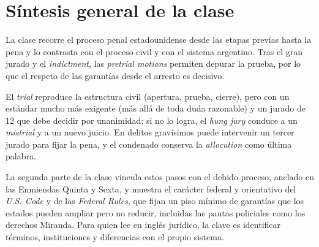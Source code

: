 \documentclass[12pt,oneside]{book}
\begin{document}
\chapter[Síntesis general de la clase]{Síntesis general de la clase}

La clase recorre el proceso penal estadounidense desde las etapas previas hasta la pena y lo contrasta con el proceso civil y con el sistema argentino. Tras el gran jurado y el \textit{indictment}, las \textit{pretrial motions} permiten depurar la prueba, por lo que el respeto de las garantías desde el arresto es decisivo.

El \textit{trial} reproduce la estructura civil (apertura, prueba, cierre), pero con un estándar mucho más exigente (más allá de toda duda razonable) y un jurado de 12 que debe decidir por unanimidad; si no lo logra, el \textit{hung jury} conduce a un \textit{mistrial} y a un nuevo juicio. En delitos gravísimos puede intervenir un tercer jurado para fijar la pena, y el condenado conserva la \textit{allocution} como última palabra.

La segunda parte de la clase vincula estos pasos con el debido proceso, anclado en las Enmiendas Quinta y Sexta, y muestra el carácter federal y orientativo del \textit{U.S. Code} y de las \textit{Federal Rules}, que fijan un piso mínimo de garantías que los estados pueden ampliar pero no reducir, incluidas las pautas policiales como los derechos Miranda. Para quien lee en inglés jurídico, la clave es identificar términos, instituciones y diferencias con el propio sistema.
\end{document}
